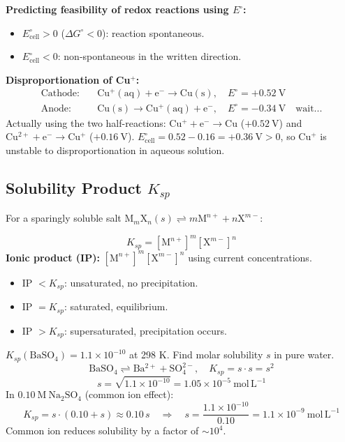 \documentclass[12pt,a4paper]{article}
\begin{document}
\textbf{Predicting feasibility of redox reactions using $E^\circ$:}
\begin{itemize}[leftmargin=*, itemsep=1pt, topsep=2pt]
  \item $E^\circ_{\mathrm{cell}} > 0$ ($\Delta G^\circ < 0$): reaction spontaneous.
  \item $E^\circ_{\mathrm{cell}} < 0$: non-spontaneous in the written direction.
\end{itemize}

\textbf{Disproportionation of Cu$^+$:}
\begin{align*}
\text{Cathode:}&\quad \mathrm{Cu^+(aq) + e^- \to Cu(s)},\quad E^\circ = +0.52\ \mathrm{V}\\
\text{Anode:}&\quad \mathrm{Cu(s) \to Cu^+(aq) + e^-},\quad E^\circ = -0.34\ \mathrm{V}\quad\text{wait...}
\end{align*}
Actually using the two half-reactions:
$\mathrm{Cu^+ + e^- \to Cu}$ ($+0.52\ \mathrm{V}$) and $\mathrm{Cu^{2+} + e^- \to Cu^+}$ ($+0.16\ \mathrm{V}$).
$E^\circ_{\mathrm{cell}} = 0.52 - 0.16 = +0.36\ \mathrm{V} > 0$, so Cu$^+$ is unstable to disproportionation in aqueous solution.

\subsection{Solubility Product \texorpdfstring{$K_{sp}$}{Ksp}}
For a sparingly soluble salt $\mathrm{M}_m\mathrm{X}_n(s) \rightleftharpoons m\mathrm{M}^{n+} + n\mathrm{X}^{m-}$:

\begin{tcolorbox}[formulabox, title={Solubility Product}]
\[
K_{sp} = [\mathrm{M}^{n+}]^m[\mathrm{X}^{m-}]^n
\]
\textbf{Ionic product (IP):} $[\mathrm{M}^{n+}]^m[\mathrm{X}^{m-}]^n$ using current concentrations.
\begin{itemize}[leftmargin=*, itemsep=1pt, topsep=2pt]
  \item IP $< K_{sp}$: unsaturated, no precipitation.
  \item IP $= K_{sp}$: saturated, equilibrium.
  \item IP $> K_{sp}$: supersaturated, precipitation occurs.
\end{itemize}
\end{tcolorbox}

\begin{tcolorbox}[examplebox, title={Solved Example: Solubility from \texorpdfstring{$K_{sp}$}{Ksp}}]
$K_{sp}(\mathrm{BaSO_4}) = 1.1\times10^{-10}$ at 298 K. Find molar solubility $s$ in pure water.
\[
\mathrm{BaSO_4 \rightleftharpoons Ba^{2+} + SO_4^{2-}},\quad K_{sp} = s\cdot s = s^2
\]
\[
s = \sqrt{1.1\times10^{-10}} = 1.05\times10^{-5}\ \mathrm{mol\,L^{-1}}
\]
In $0.10\ \mathrm{M}\ \mathrm{Na_2SO_4}$ (common ion effect):
\[
K_{sp} = s\cdot(0.10 + s) \approx 0.10\,s \quad\Rightarrow\quad s = \frac{1.1\times10^{-10}}{0.10} = 1.1\times10^{-9}\ \mathrm{mol\,L^{-1}}
\]
Common ion reduces solubility by a factor of $\sim 10^4$.
\end{tcolorbox}
\end{document}
